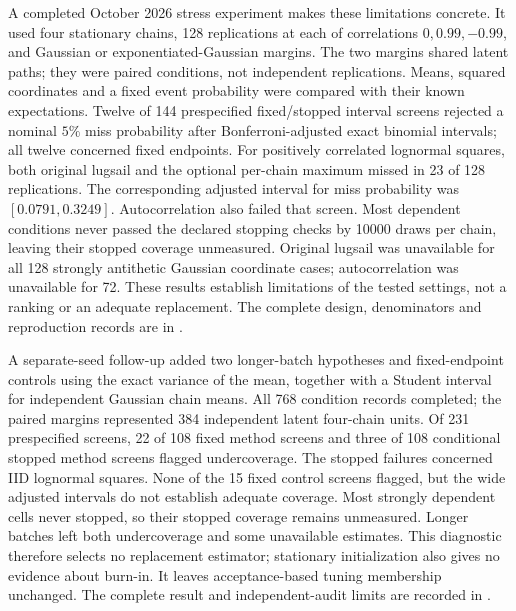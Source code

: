 A completed October 2026 stress experiment makes these limitations concrete.
It used four stationary chains, 128 replications at each of correlations
$0,0.99,-0.99$, and Gaussian or exponentiated-Gaussian margins. The two
margins shared latent paths; they were paired conditions, not independent
replications. Means, squared coordinates and a fixed event probability were
compared with their known expectations. Twelve of 144 prespecified
fixed/stopped interval screens rejected a nominal $5\%$ miss probability
after Bonferroni-adjusted exact binomial intervals; all twelve concerned
fixed endpoints. For positively correlated lognormal squares, both original
lugsail and the optional per-chain maximum missed in 23 of 128 replications.
The corresponding adjusted interval for miss probability was
$[0.0791,0.3249]$. Autocorrelation also failed that screen.
Most dependent conditions never passed the declared stopping checks by
10000 draws per chain, leaving their stopped coverage unmeasured. Original
lugsail was unavailable for all 128 strongly antithetic Gaussian coordinate
cases; autocorrelation was unavailable for 72. These results establish
limitations of the tested settings, not a ranking or an adequate replacement.
The complete design, denominators and reproduction records are in
.

A separate-seed follow-up added two longer-batch hypotheses and fixed-endpoint
controls using the exact variance of the mean, together with a Student
interval for independent Gaussian chain means. All 768 condition records
completed; the paired margins represented 384 independent latent four-chain
units. Of 231 prespecified screens, 22 of 108 fixed method screens and three
of 108 conditional stopped method screens flagged undercoverage. The stopped
failures concerned IID lognormal squares. None of the 15 fixed control
screens flagged, but the wide adjusted intervals do not establish adequate
coverage. Most strongly dependent cells never stopped, so their stopped
coverage remains unmeasured. Longer batches left both undercoverage and some
unavailable estimates. This diagnostic therefore selects no replacement
estimator; stationary initialization also gives no evidence about burn-in.
It leaves acceptance-based tuning membership unchanged. The complete result
and independent-audit limits are recorded in
.

